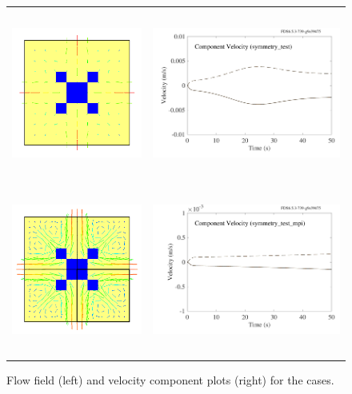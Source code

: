 \documentclass[11pt]{book}
\begin{document}
\begin{figure}[!ht]
\begin{tabular*}{\textwidth}{lr}
\includegraphics[height=2.2in]{SCRIPT_FIGURES/symmetry_test} &
\includegraphics[height=2.2in]{SCRIPT_FIGURES/symmetry_test_plot} \\
\includegraphics[height=2.2in]{SCRIPT_FIGURES/symmetry_test_mpi} &
\includegraphics[height=2.2in]{SCRIPT_FIGURES/symmetry_test_mpi_plot}
\end{tabular*}
\caption[The  cases]{Flow field (left) and velocity component plots (right) for the  cases.}
\label{symmetry_test_fig}
\end{figure}
\end{document}
